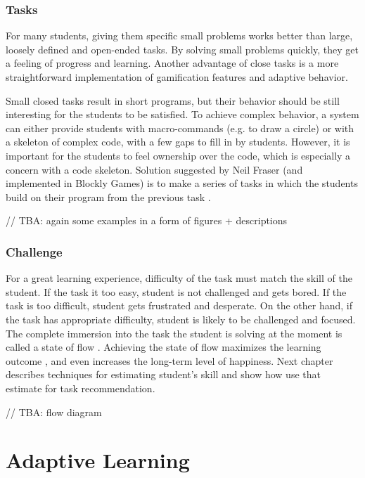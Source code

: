 \documentclass[
    digital,
    color,
    11pt,
    nocover,
    table,  %
    nolof,  %
    nolot,  %
    microtype,
]{fithesis3}
\begin{document}
\subsection{Tasks}
\label{sec:motivation.tasks}
For many students, giving them specific small problems works better
  than large, loosely defined and open-ended tasks.
By solving small problems quickly,
  they get a feeling of progress and learning.
Another advantage of close tasks
  is a more straightforward implementation of gamification features and adaptive behavior.

Small closed tasks result in short programs,
  but their behavior should be still interesting for the students to be satisfied.
To achieve complex behavior,
  a system can either provide students with macro-commands (e.g. to draw a circle)
  or with a skeleton of complex code, with a few gaps to fill in by students.
However, it is important for the students to feel ownership over the code,
  which is especially a concern with a code skeleton.
Solution suggested by Neil Fraser (and implemented in Blockly Games)
  is to make a series of tasks in which the students
  build on their program from the previous task
  \cite{blockly-10-things}.

// TBA: again some examples in a form of figures + descriptions



\subsection{Challenge}
\label{sec:motivation.challenge}
For a great learning experience,
  difficulty of the task must match the skill of the student.
If the task it too easy,
  student is not challenged and gets bored.
If the task is too difficult,
  student gets frustrated and desperate.
On the other hand, if the task has appropriate difficulty,
  student is likely to be challenged and focused.
The complete immersion into the task the student is solving at the moment is called
  a state of flow \cite{flow}.
Achieving the state of flow maximizes the learning outcome \cite{adaptive-practice},
  and even increases the long-term level of happiness. %
Next chapter describes techniques for estimating student’s skill
  and show how use that estimate for task recommendation.

// TBA: flow diagram


\chapter{Adaptive Learning}
\label{chap:adaptive-learning}
\end{document}

